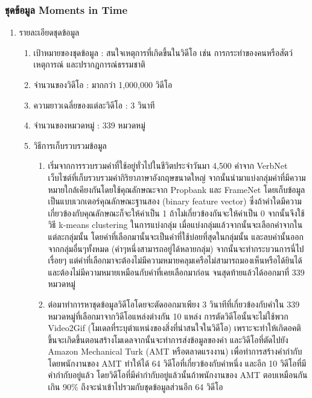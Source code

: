 \subsubsection*{ชุดข้อมูล Moments in Time}
\begin{enumerate}
	\item {รายละเอียดชุดข้อมูล}
	\begin{enumerate}
		\setlength\itemsep{-0.25em}
		\item เป้าหมายของชุดข้อมูล : สนใจเหตุการที่เกิดขึ้นในวิดีโอ เช่น การกระทำของคนหรือสัตว์ เหตุการณ์ และปรากฎการณ์ธรรมชาติ 
		\item จำนวนของวิดีโอ : มากกว่า 1,000,000 วิดีโอ
		\item ความยาวเฉลี่ยของแต่ละวิดีโอ : 3 วินาที
		\item จำนวนของหมวดหมู่ : 339 หมวดหมู่
		\item วิธีการเก็บรวบรวมข้อมูล
	\begin{enumerate}
		\item เริ่มจากการรวบรวมคำที่ใช้อยู่ทั่วไปในชีวิตประจำวันมา 4,500 คำจาก VerbNet\textsuperscript{\cite{Schuler:2005:VBC:1104493}} เว็บไซต์ที่เก็บรวบรวมคำกิริยาภาษาอังกฤษขนาดใหญ่ 
		จากนั้นนำมาแบ่งกลุ่มคำที่มีความหมายใกล้เคียงกันโดยใช้คุณลักษณะจาก Propbank\textsuperscript{\cite{Zaghouani:2010:RAP:1868720.1868756}} และ
		FrameNet\textsuperscript{\cite{Baker:1998:BFP:980451.980860}} โดยเก็บข้อมูลเป็นแบบเวกเตอร์คุณลักษณะฐานสอง (binary feature vector) 
		ซึ่งถ้าคำใดมีความเกี่ยวข้องกับคุณลักษณะก็จะให้ค่าเป็น 1 ถ้าไม่เกี่ยวข้องกันจะให้ค่าเป็น 0 จากนั้นจึงใช้วิธี k-means clustering ในการแบ่งกลุ่ม 
		เมื่อแบ่งกลุ่มแล้วจากนั้นจะเลือกคำจากในแต่ละกลุ่มนั้น โดยคำที่เลือกมานั้นจะเป็นคำที่ใช้บ่อยที่สุดในกลุ่มนั้น และลบคำนั้นออกจากกลุ่มอื่นๆทั้งหมด (คำๆหนึ่งสามารถอยู่ได้หลายกลุ่ม) 
		จากนั้นจะทำกระบวนการนี่ไปเรื่อยๆ แต่คำที่เลือกมาจะต้องไม่มีความหมายคลุมเครือไม่สามารถมองเห็นหรือได้ยินได้ และต้องไม่มีความหมายเหมือนกับคำที่เคยเลือกมาก่อน 
		จนสุดท้ายแล้วได้ออกมาที่ 339 หมวดหมู่
		\item ต่อมาทำการหาชุดข้อมูลวิดีโอโดยจะตัดออกมาเพียง 3 วินาทีที่เกี่ยวข้องกับคำใน 339 หมวดหมู่ที่เลือกมาจากวิดีโอแหล่งต่างกัน 10 แหล่ง 
		การตัดวิดีโอนั้นจะไม่ใช้พวก Video2Gif (โมเดลที่ระบุตำแหน่งของสิ่งที่น่าสนใจในวิดีโอ) เพราะจะทำให้เกิดอคติขึ้นจะเกิดขึ้นตอนสร้างโมเดลจากนั้นจะทำการส่งข้อมูลของคำ
		และวิดีโอที่ตัดไปยัง Amazon Mechanical Turk (AMT หรือตลาดแรงงาน) เพื่อทำการสร้างคำกำกับโดยพนักงานของ AMT ทำให้ได้ 64 วิดีโอที่เกี่ยวข้องกับคำหนึ่ง 
		และอีก 10 วิดีโอที่มีคำกำกับอยู่แล้ว โดยวิดีโอที่มีคำกำกับอยู่แล้วนั้นถ้าพนักงานของ AMT ตอบเหมือนกันเกิน 90\% ถึงจะนำเข้าไปรวมกับชุดข้อมูลส่วนอีก 64 วิดีโอ

\end{enumerate}
\end{enumerate}
\end{enumerate}

